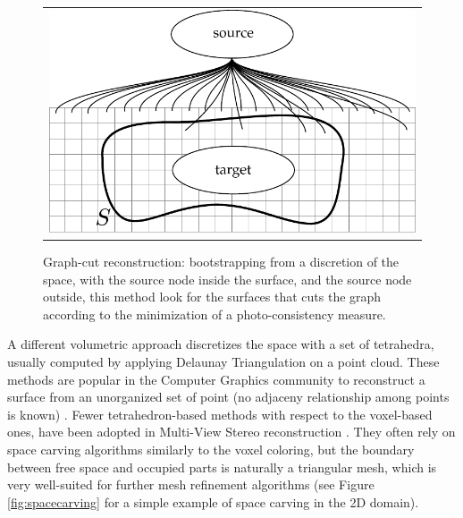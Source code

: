 \begin{figure}[t]
\centering
 \begin{tabular}{c}
  \includegraphics[width=0.96\columnwidth]{./img/ch_soa/graphcut}\\
 \end{tabular}
 \caption{Graph-cut reconstruction: bootstrapping from a discretion of the space, with the source node inside the surface, and the source node outside, this method look for the surfaces that cuts the graph according to the minimization of a photo-consistency measure.}
 \label{fig:graphcut}
\end{figure}




\label{sec:tet-based}
A different volumetric approach discretizes the space with a set of tetrahedra, usually computed by applying Delaunay Triangulation on a point cloud.
These methods are popular in the Computer Graphics community to reconstruct a surface from an unorganized  set of point (no adjaceny relationship among points is known)  \cite{amenta1999surface,amenta2001power,boissonnat1984geometric,dey2004provable,kolluri2004spectral}. 
Fewer tetrahedron-based methods with respect to the voxel-based ones, have been adopted in Multi-View Stereo reconstruction
\cite{faugeras_et_al_90,labatut2007efficient,salman2010surface,vu_et_al_2012,hiep2009towards,Pan_et_al09}.
They often rely on space carving algorithms similarly to the voxel coloring, but the boundary between free space and occupied parts is naturally a triangular mesh, which is very well-suited for further mesh refinement algorithms (see Figure \ref{fig:spacecarving} for a simple example of space carving in the 2D domain).




